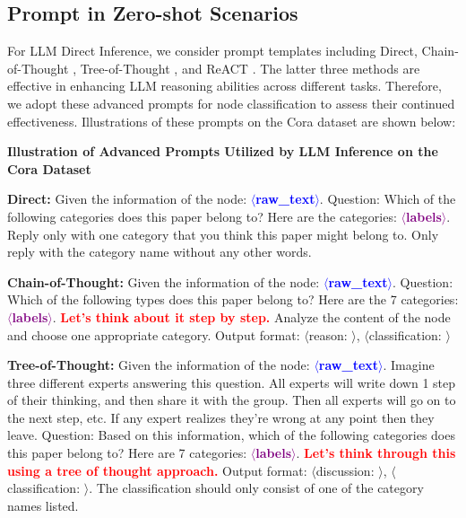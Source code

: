\subsection{Prompt in Zero-shot Scenarios}\label{sec:zeroshot_prompt}

For LLM Direct Inference, we consider prompt templates including Direct, Chain-of-Thought \cite{Wei2022ChainOT}, Tree-of-Thought \cite{yao2023tree}, and ReACT \cite{Yao2022ReActSR}. The latter three methods are effective in enhancing LLM reasoning abilities across different tasks. Therefore, we adopt these advanced prompts for node classification to assess their continued effectiveness. Illustrations of these prompts on the Cora dataset are shown below: 
\begin{tcolorbox}[colback=gray!10, colframe=black, boxrule=1pt, arc=2pt, left=5pt, right=5pt]
\textbf{Illustration of Advanced Prompts Utilized by LLM Inference on the Cora Dataset}
\vspace*{5pt}

\small

\textbf{Direct:}
{Given the information of the node: \textcolor{blue}{\textbf{$\langle$raw\_text$\rangle$}}. Question: Which of the following categories does this paper belong to? Here are the categories: \textcolor{purple}{\textbf{$\langle$labels$\rangle$}}. Reply only with one category that you think this paper might belong to. Only reply with the category name without any other words. 
} \vspace*{3pt}

 \textbf{Chain-of-Thought:} 
{
Given the information of the node: \textcolor{blue}{\textbf{$\langle$raw\_text$\rangle$}}. 
Question: Which of the following types does this paper belong to? 
Here are the 7 categories: \textcolor{purple}{\textbf{$\langle$labels$\rangle$}}. \textcolor{red}{\textbf{Let's think about it step by step.}} Analyze the content of the node and choose one appropriate category.
Output format: $\langle$reason: $\rangle$, $\langle$classification: $\rangle$
 } \vspace*{3pt}

\textbf{Tree-of-Thought: }{Given the information of the node: \textcolor{blue}{\textbf{$\langle$raw\_text$\rangle$}}. 
Imagine three different experts answering this question. 
All experts will write down 1 step of their thinking, and then share it with the group. 
Then all experts will go on to the next step, etc. If any expert realizes they're wrong at any point then they leave.
Question: Based on this information, which of the following categories does this paper belong to? 
Here are 7 categories: \textcolor{purple}{\textbf{$\langle$labels$\rangle$}}. \textcolor{red}{\textbf{Let's think through this using a tree of thought approach. }}
Output format: $\langle$discussion: $\rangle$, $\langle$classification: $\rangle$. The classification should only consist of one of the category names listed.
} \vspace*{3pt}


\end{tcolorbox}
